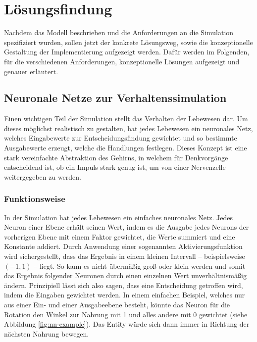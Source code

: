 \documentclass[course=erap]{aspdoc}
\begin{document}
\newpage
\section{Lösungsfindung}
\label{sec:lösungsfindung}
Nachdem das Modell beschrieben und die Anforderungen an die Simulation spezifiziert wurden, sollen jetzt der konkrete Lösungsweg, sowie die konzeptionelle Gestaltung der Implementierung aufgezeigt werden. Dafür werden im Folgenden, für die verschiedenen Anforderungen, konzeptionelle Lösungen aufgezeigt und genauer erläutert.


\subsection{Neuronale Netze zur Verhaltenssimulation}
\label{subsec:neuronale-netze}
Einen wichtigen Teil der Simulation stellt das Verhalten der Lebewesen dar. Um dieses möglichst realistisch zu gestalten, hat jedes Lebewesen ein neuronales Netz, welches Eingabewerte zur Entscheidungsfindung gewichtet und so bestimmte Ausgabewerte erzeugt, welche die Handlungen festlegen. Dieses Konzept ist eine stark vereinfachte Abstraktion des Gehirns, in welchem für Denkvorgänge entscheidend ist, ob ein Impuls stark genug ist, um von einer Nervenzelle weitergegeben zu werden.


\subsubsection{Funktionsweise}

In der Simulation hat jedes Lebewesen ein einfaches neuronales Netz. Jedes Neuron einer Ebene erhält seinen Wert, indem es die Ausgabe jedes Neurons der vorherigen Ebene mit einem Faktor gewichtet, die Werte summiert und eine Konstante addiert. Durch Anwendung einer sogenannten Aktivierungsfunktion wird sichergestellt, dass das Ergebnis in einem kleinen Intervall -- beispielsweise $(-1,1)$ -- liegt. So kann es nicht übermäßig groß oder klein werden und somit das Ergebnis folgender Neuronen durch einen einzelnen Wert unverhältnismäßig ändern. Prinzipiell lässt sich also sagen, dass eine Entscheidung getroffen wird, indem die Eingaben gewichtet werden. In einem einfachen Beispiel, welches nur aus einer Ein- und einer Ausgabeebene besteht, könnte das Neuron für die Rotation den Winkel zur Nahrung mit 1 und alles andere mit 0 gewichtet (siehe Abbildung \ref{fig:nn-example}). Das Entity würde sich dann immer in Richtung der nächsten Nahrung bewegen.
\end{document}
